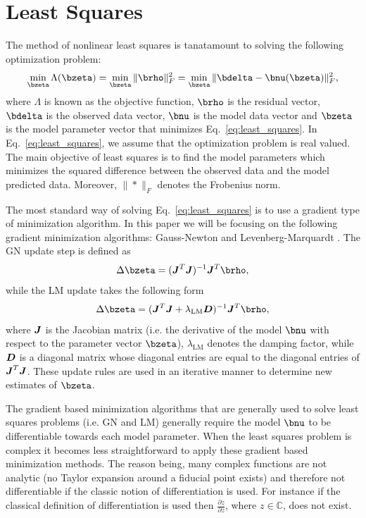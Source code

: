 \documentclass[useAMS,usenatbib]{mn2e}
\newcommand{\bJ}{\bmath{J}}
\newcommand{\bD}{\bmath{D}}
\newcommand{\conj}[1]{\overline{#1}}
\begin{document}
\section{Least Squares}
\label{sec:ls}
The method of nonlinear least squares is tanatamount to solving the following optimization problem:  
\begin{equation}
\label{eq:least_squares}
\min_{\bzeta} \Lambda(\bzeta) = \min_{\bzeta} \|\brho\|_F^2 = \min_{\bzeta} \|\bdelta - \bnu(\bzeta)\|_F^2, 
\end{equation}
where $\Lambda$ is known as the objective function, $\brho$ is the residual vector, $\bdelta$ is the observed data vector, $\bnu$ is the model data vector and $\bzeta$ is the model parameter vector that minimizes Eq.~\eqref{eq:least_squares}.
In Eq.~\eqref{eq:least_squares}, we assume that the optimization problem is real valued.
The main objective of least squares is to find the model parameters which minimizes the squared difference between the observed data and the model predicted data. Moreover, $\|*\|_F$ denotes the 
Frobenius norm.

The most standard way of solving Eq.~\eqref{eq:least_squares} is to use a gradient type of minimization algorithm. In this paper we will be focusing on the following gradient minimization algorithms: Gauss-Newton and Levenberg-Marquardt \citep{Levenberg1944,Marquardt1963}. 
The GN update step is defined as
\begin{equation}
 \Delta \bzeta = (\bJ^T\bJ)^{-1} \bJ^T\brho,
\end{equation}
while the LM update takes the following form
\begin{equation}
 \Delta \bzeta = (\bJ^T\bJ+\lambda_{\textrm{LM}}\bD)^{-1} \bJ^T\brho,
\end{equation}
where $\bJ$ is the Jacobian matrix (i.e. the derivative of the model $\bnu$ with respect to the parameter vector $\bzeta$), $\lambda_{\textrm{LM}}$ denotes the 
damping factor, while $\bD$ is a diagonal matrix whose diagonal entries are equal to the diagonal entries of $\bJ^T\bJ$. These update rules are used in an iterative manner to 
determine new estimates of $\bzeta$.

The gradient based minimization algorithms that are generally used to solve least squares problems (i.e. GN and LM) generally require the model $\bnu$ to be differentiable
towards each model parameter. When the least squares problem is complex it becomes less straightforward to apply these gradient based minimization methods. The reason being,
many complex functions are not analytic (no Taylor expansion around a fiducial point exists) and therefore not differentiable if the classic notion of differentiation is used. For instance if the 
classical definition of differentiation is used then $\frac{\partial z}{\partial \conj{z}}$, where $z \in \mathbb{C}$, does not exist.
\end{document}
